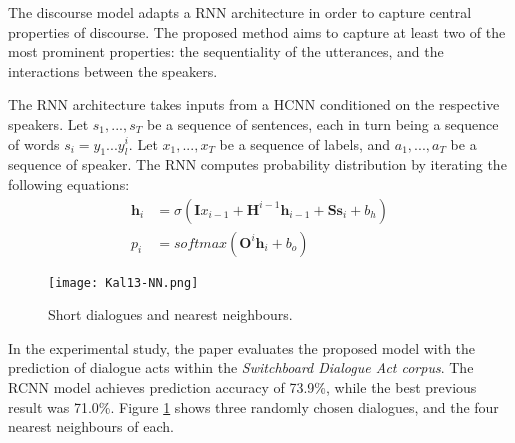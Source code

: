 The discourse model adapts a RNN architecture in order to capture central properties of discourse. The proposed method aims to capture at least two of the most prominent properties: the sequentiality of the utterances, and the interactions between the speakers.

The RNN architecture takes inputs from a HCNN conditioned on the respective speakers. Let $s_1, ..., s_T$ be a sequence of sentences, each in turn being a sequence of words $s_i = y_1 ... y_l^i$. Let $x_1, ..., x_T$ be a sequence of labels, and $a_1, ..., a_T$ be a sequence of speaker. The RNN computes probability distribution by iterating the following equations:
\begin{align*}
\mathbf{h}_i &= \sigma(\mathbf{I} x_{i-1} + \mathbf{H}^{i-1}\mathbf{h}_{i-1} + \mathbf{Ss}_i + b_h)\\
         p_i &= softmax(\mathbf{O}^i \mathbf{h}_i + b_o)
\end{align*}

\begin{figure}[h]
  \centering
  \texttt{[image: Kal13-NN.png]}\\
  \caption{Short dialogues and nearest neighbours.}\label{fig:Kal13-NN}
\end{figure}

In the experimental study, the paper evaluates the proposed model with the prediction of dialogue acts within the \emph{Switchboard Dialogue Act corpus}. The RCNN model achieves prediction accuracy of 73.9\%, while the best previous result was 71.0\%. Figure \ref{fig:Kal13-NN} shows three randomly chosen dialogues, and the four nearest neighbours of each.
